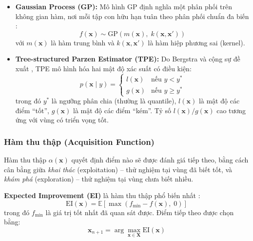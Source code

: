 \begin{itemize}
    \item \textbf{Gaussian Process (GP):} Mô hình GP định nghĩa một phân phối trên không gian hàm, nơi mỗi tập con hữu hạn tuân theo phân phối chuẩn đa biến \cite{rasmussen2006gp}:
    \begin{equation}
        f(\mathbf{x}) \sim \mathrm{GP}\left(m(\mathbf{x}),\; k(\mathbf{x}, \mathbf{x}')\right)
    \end{equation}
    với $m(\mathbf{x})$ là hàm trung bình và $k(\mathbf{x}, \mathbf{x}')$ là hàm hiệp phương sai (kernel).
    
    \item \textbf{Tree-structured Parzen Estimator (TPE):} Do Bergstra và cộng sự đề xuất \cite{bergstra2011tpe}, TPE mô hình hóa hai mật độ xác suất có điều kiện:
    \begin{equation}
        p(\mathbf{x} \mid y) = \begin{cases}
            l(\mathbf{x}) & \text{nếu } y < y^* \\
            g(\mathbf{x}) & \text{nếu } y \geq y^*
        \end{cases}
        \label{eq:tpe}
    \end{equation}
    trong đó $y^*$ là ngưỡng phân chia (thường là quantile), $l(\mathbf{x})$ là mật độ các điểm ``tốt'', $g(\mathbf{x})$ là mật độ các điểm ``kém''. Tỷ số $l(\mathbf{x})/g(\mathbf{x})$ cao tương ứng với vùng có triển vọng tốt.
\end{itemize}

\subsubsection{Hàm thu thập (Acquisition Function)}

Hàm thu thập $\alpha(\mathbf{x})$ quyết định điểm nào sẽ được đánh giá tiếp theo, bằng cách cân bằng giữa \textit{khai thác} (exploitation) -- thử nghiệm tại vùng đã biết tốt, và \textit{khám phá} (exploration) -- thử nghiệm tại vùng chưa biết nhiều.

\textbf{Expected Improvement (EI)} là hàm thu thập phổ biến nhất \cite{jones1998ei}:
\begin{equation}
    \text{EI}(\mathbf{x}) = \mathbb{E}\left[\max\left(f_{\min} - f(\mathbf{x}),\; 0\right)\right]
    \label{eq:ei}
\end{equation}
\noindent trong đó $f_{\min}$ là giá trị tốt nhất đã quan sát được. Điểm tiếp theo được chọn bằng:
\begin{equation}
    \mathbf{x}_{n+1} = \arg\max_{\mathbf{x} \in \mathbf{X}} \text{EI}(\mathbf{x})
\end{equation}

